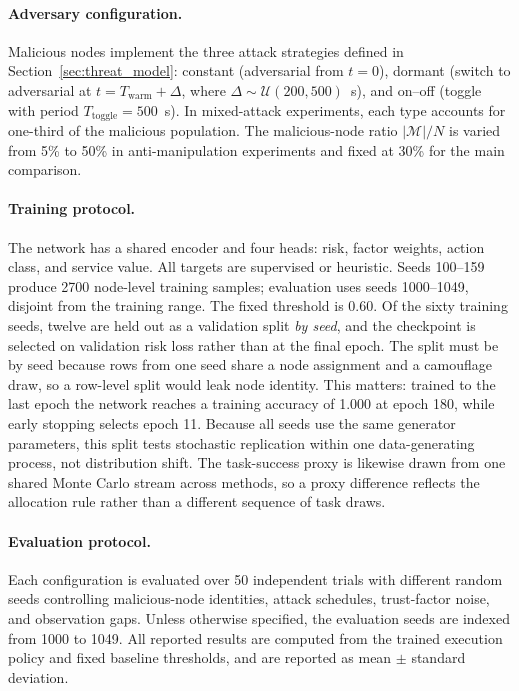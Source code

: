 \documentclass[notspecified,article,submit,moreauthors]{Definitions/mdpi}
\begin{document}
\paragraph{Adversary configuration.}
Malicious nodes implement the three attack strategies defined in Section~\ref{sec:threat_model}: constant (adversarial from $t=0$), dormant (switch to adversarial at $t = T_{\text{warm}} + \Delta$, where $\Delta \sim \mathcal{U}(200, 500)$~s), and on--off (toggle with period $T_{\text{toggle}} = 500$~s). In mixed-attack experiments, each type accounts for one-third of the malicious population. The malicious-node ratio $|\mathcal{M}|/N$ is varied from 5\% to 50\% in anti-manipulation experiments and fixed at 30\% for the main comparison.

\paragraph{Training protocol.}
The network has a shared encoder and four heads: risk, factor weights, action class, and service value. All targets are supervised or heuristic. Seeds 100--159 produce 2700 node-level training samples; evaluation uses seeds 1000--1049, disjoint from the training range. The fixed threshold is 0.60. Of the sixty training seeds, twelve are held out as a validation split \emph{by seed}, and the checkpoint is selected on validation risk loss rather than at the final epoch. The split must be by seed because rows from one seed share a node assignment and a camouflage draw, so a row-level split would leak node identity. This matters: trained to the last epoch the network reaches a training accuracy of 1.000 at epoch 180, while early stopping selects epoch 11. Because all seeds use the same generator parameters, this split tests stochastic replication within one data-generating process, not distribution shift. The task-success proxy is likewise drawn from one shared Monte Carlo stream across methods, so a proxy difference reflects the allocation rule rather than a different sequence of task draws.

\paragraph{Evaluation protocol.}
Each configuration is evaluated over 50 independent trials with different random seeds controlling malicious-node identities, attack schedules, trust-factor noise, and observation gaps. Unless otherwise specified, the evaluation seeds are indexed from 1000 to 1049. All reported results are computed from the trained execution policy and fixed baseline thresholds, and are reported as mean $\pm$ standard deviation.
\end{document}
